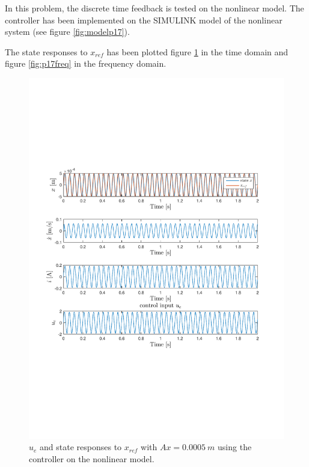 In this problem, the discrete time feedback is tested on the nonlinear model. The controller has been implemented on the SIMULINK model of the nonlinear system (see figure \ref{fig:modelp17}).

The state responses to $x_{ref}$ has been plotted figure \ref{fig:p17time} in the time domain and figure \ref{fig:p17freq} in the frequency domain. 

\begin{figure}[H]
 \centering 
 \includegraphics[trim=0cm 7cm 0cm 7cm, clip=true, totalheight=0.35\textheight, angle=0]{figures/p17time.pdf}
 \caption{$u_e$ and state responses to $x_{ref}$ with $Ax = 0.0005\ m$ using the controller on the nonlinear model.}
 \label{fig:p17time}
\end{figure}

